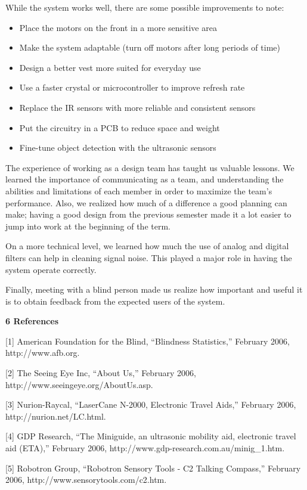 While the system works well, there are some possible improvements to
note:

\begin{itemize}
\item
  Place the motors on the front in a more sensitive area
\item
  Make the system adaptable (turn off motors after long periods of time)
\item
  Design a better vest more suited for everyday use
\item
  Use a faster crystal or microcontroller to improve refresh rate
\item
  Replace the IR sensors with more reliable and consistent sensors
\item
  Put the circuitry in a PCB to reduce space and weight
\item
  Fine-tune object detection with the ultrasonic sensors
\end{itemize}

The experience of working as a design team has taught us valuable
lessons. We learned the importance of communicating as a team, and
understanding the abilities and limitations of each member in order to
maximize the team's performance. Also, we realized how much of a
difference a good planning can make; having a good design from the
previous semester made it a lot easier to jump into work at the
beginning of the term.

On a more technical level, we learned how much the use of analog and
digital filters can help in cleaning signal noise. This played a major
role in having the system operate correctly.

Finally, meeting with a blind person made us realize how important and
useful it is to obtain feedback from the expected users of the system.

\textbf{6 References}

{[}1{]} American Foundation for the Blind, ``Blindness Statistics,''
February 2006, http://www.afb.org.

{[}2{]} The Seeing Eye Inc, ``About Us,'' February 2006,
http://www.seeingeye.org/AboutUs.asp.

{[}3{]} Nurion-Raycal, ``LaserCane N-2000, Electronic Travel Aids,''
February 2006, http://nurion.net/LC.html.

{[}4{]} GDP Research, ``The Miniguide, an ultrasonic mobility aid,
electronic travel aid (ETA),'' February 2006,
http://www.gdp-research.com.au/minig\_1.htm.

{[}5{]} Robotron Group, ``Robotron Sensory Tools - C2 Talking Compass,''
February 2006, http://www.sensorytools.com/c2.htm.

